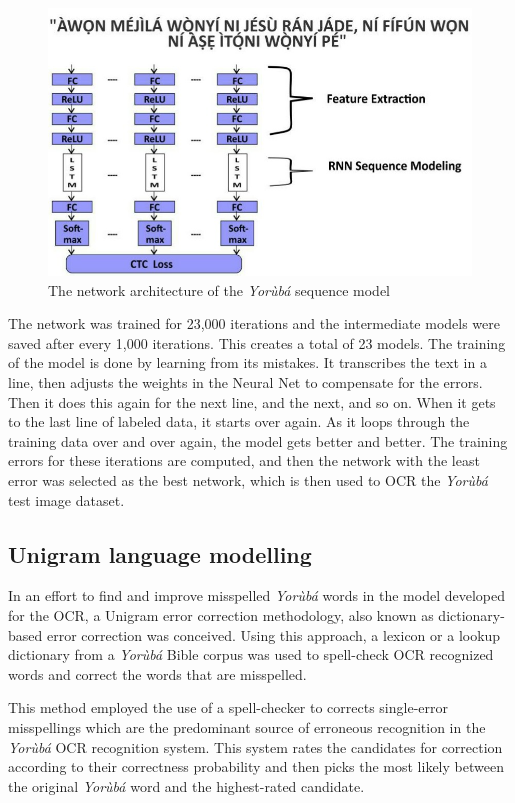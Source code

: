 \documentclass[review]{elsarticle}
\newcommand{\yor}{\textit{Yor\`ub\'a }}
\begin{document}
\begin{figure}[h]
\centering
\includegraphics[width=0.8\linewidth, height=0.2\textheight]{lstm1}
\caption{The network architecture of the \yor sequence model}
\label{fig:lstm1}
\end{figure}
The network was trained for 23,000 iterations and the intermediate models were saved after every 1,000 iterations. This creates a total of 23 models. The training of the model is done by learning from its mistakes. It transcribes the text in a line, then adjusts the weights in the Neural Net to compensate for the errors. Then it does this again for the next line, and the next, and so on. When it gets to the last line of labeled data, it starts over again. As it loops through the training data over and over again, the model gets better and better. The training errors for these iterations are computed, and then the network with the least error was selected as the best network, which is then used to OCR  the \yor test image dataset.


\subsection{Unigram language modelling}
In an effort to find and improve misspelled \yor words in the model developed for the OCR, a Unigram error correction methodology, also known as dictionary-based error correction was conceived. Using this approach, a lexicon or a lookup dictionary from a \yor Bible corpus was used to spell-check OCR recognized words and correct the words that are misspelled. 

This method employed the use of a spell-checker to corrects single-error misspellings which are the predominant source of erroneous recognition in the \yor OCR recognition system. This system rates the candidates for correction according to their correctness probability and then picks the most likely between the original \yor word and the highest-rated candidate. 
\end{document}
